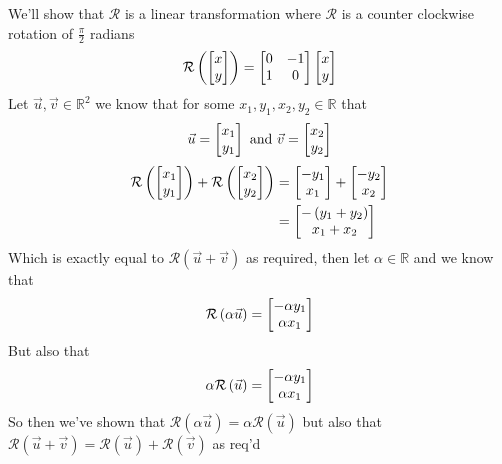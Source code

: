 \documentclass[11pt]{book}
\begin{document}
\begin{eg}
    We'll show that $\mathcal{R}$ is a linear transformation where $\mathcal{R}$
    is a counter clockwise rotation of $\frac{\pi }{2}$ radians
    \begin{equation*}
       \mathcal{R}\left(\begin{bmatrix} x \\ y \end{bmatrix}\right) = \begin{bmatrix} 0 & -1 \\ 1 & 0 \end{bmatrix} \begin{bmatrix} x \\ y \end{bmatrix}
    \end{equation*}
    Let $\vec{u}, \vec{v} \in \mathbb{R}^2$ we know that for some $x_1, y_1,
    x_2, y_2 \in \mathbb{R}$ that
    \begin{equation*}
        \vec{u} = \begin{bmatrix} x_1 \\ y_1 \end{bmatrix} \text{ and } \vec{v} = \begin{bmatrix} x_2 \\ y_2 \end{bmatrix}
    \end{equation*}
    \begin{align*}
        \mathcal{R}\left(\begin{bmatrix} x_1 \\ y_1 \end{bmatrix}\right) + \mathcal{R}\left(\begin{bmatrix} x_2
        \\ y_2 \end{bmatrix}\right) &= \begin{bmatrix} -y_1 \\ x_1 \end{bmatrix} + \begin{bmatrix} -y_2 \\ x_2 \end{bmatrix}\\
                        &= \begin{bmatrix} - \left( y_1 + y_2 \right) \\ x_1 + x_2 \end{bmatrix}\\
    \end{align*}
    Which is exactly equal to $\mathcal{R}\left(\vec{u} + \vec{v}\right)$ as
    required, then let $\alpha \in \mathbb{R}$ and we know that
    \begin{equation*}
        \mathcal{R}\left(\alpha \vec{u}\right) = \begin{bmatrix} -\alpha y_1 \\ \alpha x_1 \end{bmatrix}
    \end{equation*}
    But also that 
    \begin{equation*}
        \alpha \mathcal{R}\left(\vec{u}\right) = \begin{bmatrix} -\alpha y_1 \\ \alpha x_1 \end{bmatrix}
    \end{equation*}
    So then we've shown that $\mathcal{R}\left(\alpha \vec{u}\right) = \alpha
    \mathcal{R }\left(\vec{u}\right)$ but also that $\mathcal{R}\left(\vec{u} + \vec{v}\right) = \mathcal{R}\left(\vec{u}\right) + \mathcal{R}\left(\vec{v}\right)$ as req'd
\end{eg}
\end{document}
